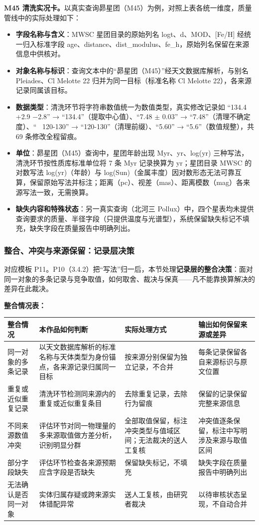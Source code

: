 \noindent\textbf{M45 清洗实况卡。}以真实查询昴星团（M45）为例，对照上表各统一维度，质量管线中的实际处理如下：

\begin{itemize}[leftmargin=1.2em,itemsep=1pt]
\item \textbf{字段名称与含义}：MWSC 星团目录的原始列名 logt、d、MOD、[Fe/H] 经统一归入标准字段 age、distance、dist\_modulus、fe\_h，原始列名保留在来源信息中供核对。
\item \textbf{对象名称与标识}：查询文本中的“昴星团（M45）”经天文数据库解析，与别名 Pleiades、Cl Melotte 22 归并为同一目标（标准名称 Cl Melotte 22），各来源记录同属该目标。
\item \textbf{数据类型}：清洗环节将字符串数值统一为数值类型，真实修改记录如 “134.4 +2.9 $-$2.8” → “134.4”（提取中心值）、“7.48 $\pm$ 0.03” → “7.48”（清理不确定度）、“~ 120-130” → “120-130”（清理前缀）、“5.60” → “5.6”（数值规整），共 69 条修改全程留痕。
\item \textbf{单位}：昴星团（M45）查询中，星团年龄出现 Myr、yr、log(yr) 三种写法，清洗环节按性质库标准单位将 7 条 Myr 记录换算为 yr；星团目录 MWSC 的对数写法 log(yr)（年龄）与 log(Sun)（金属丰度）因对数形态无法可靠互算，保留原始写法并标注；距离（pc）、视差（mas）、距离模数（mag）各来源写法一致，无需换算。
\item \textbf{缺失内容和特殊状态}：另一真实查询（北河三 Pollux）中，四个星表均未提供查询要求的质量、半径字段（只提供温度与光谱型），系统保留缺失标记不填充，缺失字段在质量报告中明确列出。
\end{itemize}

\subsubsection{整合、冲突与来源保留：记录层决策}

对应模板 P11。P10（3.4.2）把“写法”归一后，本节处理\textbf{记录层的整合决策}：面对同一对象的多条记录与竞争取值，如何取舍、裁决与保真——凡不能靠换算解决的差异在此裁决。

\noindent\textbf{整合情况表：}

\begin{longtable}{@{}p{2.3cm}p{3.6cm}p{4.8cm}p{3.3cm}@{}}
\toprule
整合情况 & 本作品如何判断 & 实际处理方式 & 输出如何保留来源或差异 \\
\midrule
同一对象的多条记录 & 以天文数据库解析的标准名称与天体类型为身份锚点，各来源记录归属同一目标 & 按来源分别保留为独立记录，不合并 & 每条记录保留各自来源标识与原文位置 \\
重复或近似重复记录 & 清洗环节检测同来源内的重复或近似重复条目 & 去除重复记录，去除行为留痕 & 保留的记录保留完整来源信息 \\
不同来源数值冲突 & 评估环节对同一物理量的多来源取值做方差分析，识别明显分群 & 全部取值保留，标注冲突类型与值域区间；无法裁决的送人工复核 & 冲突值逐条保留，标注中写明涉及来源与取值区间 \\
部分字段缺失 & 评估环节检查各来源预期应含字段是否缺失 & 保留缺失标记，不填充 & 缺失字段在质量报告中明确列出 \\
无法确认是否同一对象 & 实体归属存疑或跨来源实体错配异常 & 送人工复核，由研究者裁决 & 以待审核状态呈现，不自动合并 \\
\bottomrule
\end{longtable}

